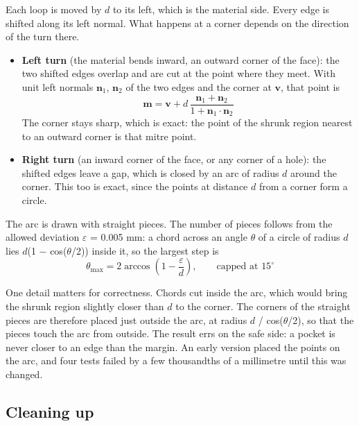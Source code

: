 \documentclass[11pt,a4paper]{article}
\begin{document}
Each loop is moved by $d$ to its left, which is the material side. Every edge is shifted along its left normal. What happens at a corner depends on the direction of the turn there. 
\begin{itemize}
 
\item \textbf{Left turn} (the material bends inward, an outward corner of the face): the two shifted edges overlap and are cut at the point where they meet. With unit left normals $\mathbf{n}_{1}$, $\mathbf{n}_{2}$ of the two edges and the corner at $\mathbf{v}$, that point is 
\begin{equation}
\mathbf{m} = \mathbf{v} + d\,\frac{\mathbf{n}_1 + \mathbf{n}_2}{1 + \mathbf{n}_1\cdot\mathbf{n}_2}
\end{equation}
 The corner stays sharp, which is exact: the point of the shrunk region nearest to an outward corner is that mitre point. 
\item \textbf{Right turn} (an inward corner of the face, or any corner of a hole): the shifted edges leave a gap, which is closed by an arc of radius $d$ around the corner. This too is exact, since the points at distance $d$ from a corner form a circle. 
\end{itemize}
 

The arc is drawn with straight pieces. The number of pieces follows from the allowed deviation $\varepsilon $ = 0.005 mm: a chord across an angle $\theta $ of a circle of radius $d$ lies $d$(1 $-$ cos($\theta $/2)) inside it, so the largest step is 
\begin{equation}
\theta_{\max} = 2\arccos\!\left(1 - \frac{\varepsilon}{d}\right), \qquad \text{capped at } 15^\circ
\end{equation}
 

One detail matters for correctness. Chords cut inside the arc, which would bring the shrunk region slightly closer than $d$ to the corner. The corners of the straight pieces are therefore placed just outside the arc, at radius $d$ / cos($\theta $/2), so that the pieces touch the arc from outside. The result errs on the safe side: a pocket is never closer to an edge than the margin. An early version placed the points on the arc, and four tests failed by a few thousandths of a millimetre until this was changed. 

\subsection{Cleaning up}
 
\end{document}

